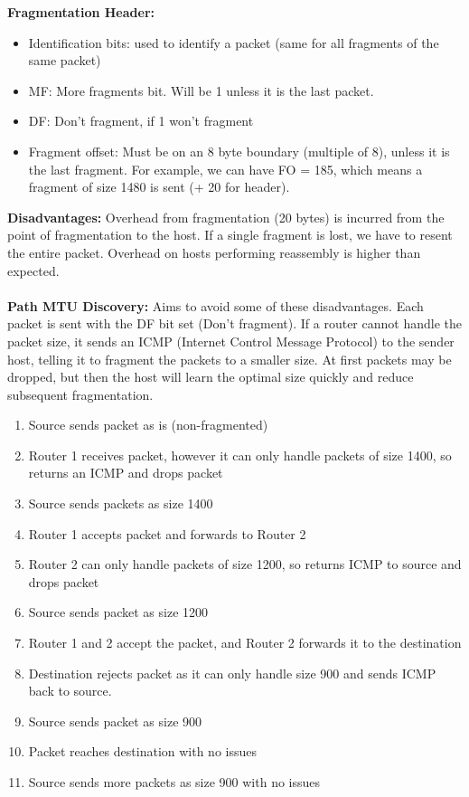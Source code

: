 \documentclass[a4paper,10pt]{article}
\begin{document}
\noindent \textcolor{Peach}{\textbf{Fragmentation Header:}} 
\begin{itemize}
	\item Identification bits: used to identify a packet (same for all fragments of the same packet)
	\item MF: More fragments bit. Will be 1 unless it is the last packet.
	\item DF: Don't fragment, if 1 won't fragment
	\item Fragment offset: Must be on an 8 byte boundary (multiple of 8), unless it is the last fragment. For example, we can have FO = 185, which means a fragment of size 1480 is sent (+ 20 for header).  
\end{itemize}
\textcolor{Peach}{\textbf{Disadvantages:}} Overhead from fragmentation (20 bytes) is incurred from the point of fragmentation to the host. If a single fragment is lost, we have to resent the entire packet. Overhead on hosts performing reassembly is higher than expected. \\\\
\textcolor{Peach}{\textbf{Path MTU Discovery:}} Aims to avoid some of these disadvantages. Each packet is sent with the DF bit set (Don't fragment). If a router cannot handle the packet size, it sends an ICMP (Internet Control Message Protocol) to the sender host, telling it to fragment the packets to a smaller size. At first packets may be dropped, but then the host will learn the optimal size quickly and reduce subsequent fragmentation. 
\begin{enumerate}
	\item Source sends packet as is (non-fragmented)
	\item Router 1 receives packet, however it can only handle packets of size 1400, so returns an ICMP and drops packet
	\item Source sends packets as size 1400 
	\item Router 1 accepts packet and forwards to Router 2 
	\item Router 2 can only handle packets of size 1200, so returns ICMP to source and drops packet 
	\item Source sends packet as size 1200 
	\item Router 1 and 2 accept the packet, and Router 2 forwards it to the destination 
	\item Destination rejects packet as it can only handle size 900 and sends ICMP back to source. 
	\item Source sends packet as size 900
	\item Packet reaches destination with no issues 
	\item Source sends more packets as size 900 with no issues
\end{enumerate}
\end{document}
